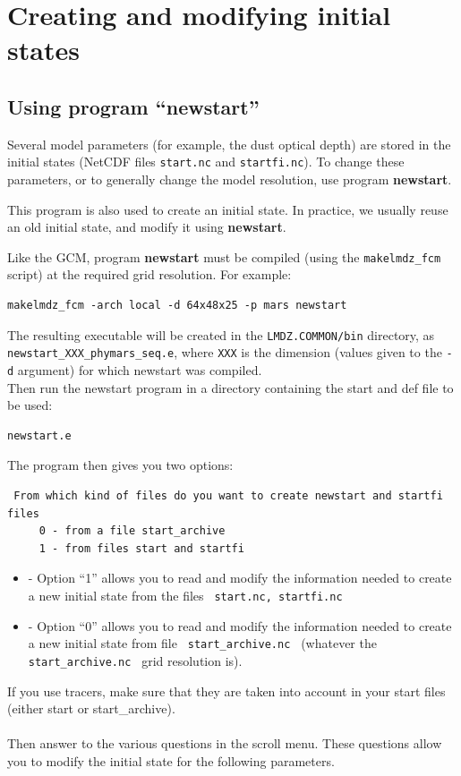 \section{Creating and modifying initial states}

\label{sc:newstart}

\subsection{Using program ``newstart''}

Several model parameters (for example, the dust optical depth) are stored in
the initial states (NetCDF files {\tt start.nc}
and {\tt startfi.nc}).
To change these parameters, or to generally change the model resolution,
use program {\bf newstart}.

This program is also used to create an initial state.
In practice, we usually reuse an old initial state, and modify it using
{\bf newstart}.

Like the GCM, program {\bf newstart} must be
compiled (using the {\tt makelmdz\_fcm} script)
at the required grid resolution.
For example:
\begin{verbatim}
makelmdz_fcm -arch local -d 64x48x25 -p mars newstart
\end{verbatim}
The resulting executable will be created in the {\tt LMDZ.COMMON/bin} directory, as \verb+newstart_XXX_phymars_seq.e+, where \verb+XXX+ is the dimension (values given to the {\tt -d} argument) for which newstart was compiled.\\

Then run the newstart program in a directory containing the start
and def file to be used:
\begin{verbatim}
newstart.e
\end{verbatim}

The program then gives you two options:
\begin{verbatim}
 From which kind of files do you want to create newstart and startfi files
     0 - from a file start_archive
     1 - from files start and startfi
\end{verbatim}

\begin{itemize}
\item{-} Option ``1'' allows you to read and modify the information needed
to create a new initial state  from the files
\verb+ start.nc, startfi.nc + 
\item{-} Option ``0'' allows you to read and modify the information needed to
create a new initial state from file
\verb+ start_archive.nc + (whatever the \verb+ start_archive.nc +
grid resolution is).\\
\end{itemize} 
If you use tracers, make sure that they are taken into account in your
start files (either start or start\_archive).\\ \\
Then answer to the various questions in the scroll menu.
These questions allow you to modify the initial state for the following
parameters. 

